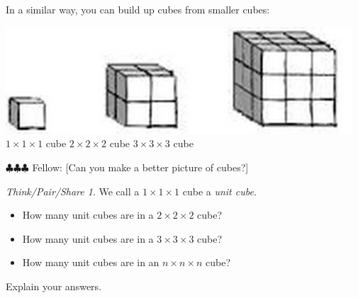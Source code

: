 \documentclass[12pt, reqno]{amsart}
\theoremstyle{remark}
\newtheorem*{thinkpair*}{Think/Pair/Share}
\theoremstyle{definition}
\numberwithin{equation}{section}  %
\newcommand{\fellow}[1]{{\color{magenta} \sf $\clubsuit\clubsuit\clubsuit$ Fellow: [#1]}}
\begin{document}
\bigskip

In a similar way, you can build up cubes from smaller cubes:
\begin{center}
\includegraphics[height=4cm]{smallercubes}\\
$1\times1\times1$ cube
\qquad\quad
$2\times2\times2$ cube
\qquad\qquad\qquad\quad
$3\times3\times3$ cube
\qquad\qquad\qquad
\end{center}
\fellow{Can you make a better picture of cubes?}

\bigskip
\bigskip

\begin{thinkpair*}
We call a $1 \times 1 \times 1$ cube a \emph{unit cube}.
\begin{itemize}
\item
How many  unit cubes are in a $2\times 2\times 2$ cube?  \\

\item
How many  unit cubes are in a $3\times 3\times 3$ cube?  \\

\item
How many  unit cubes are in an $n\times n\times n$ cube?  \\

\end{itemize}
Explain your answers.
\end{thinkpair*}



\newpage 
\end{document}
